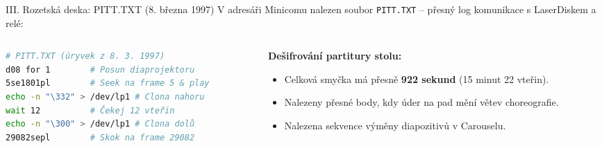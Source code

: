 \documentclass[aspectratio=169,11pt]{beamer}
\begin{document}
\begin{frame}[fragile]{III. Rozetská deska: PITT.TXT (8. března 1997)}
  V adresáři Minicomu nalezen soubor \texttt{PITT.TXT} – přesný log komunikace s LaserDiskem a relé:
  \vspace{0.2cm}
  \begin{columns}
    \begin{column}{0.48\textwidth}
\begin{lstlisting}[language=bash]
# PITT.TXT (úryvek z 8. 3. 1997)
d08 for 1        # Posun diaprojektoru
5se1801pl        # Seek na frame 5 & play
echo -n "\332" > /dev/lp1 # Clona nahoru
wait 12          # Čekej 12 vteřin
echo -n "\300" > /dev/lp1 # Clona dolů
29082sepl        # Skok na frame 29082
\end{lstlisting}
    \end{column}
    \begin{column}{0.48\textwidth}
      \textbf{Dešifrování partitury stolu:}
      \begin{itemize}
        \item Celková smyčka má přesně \textbf{922 sekund} (15 minut 22 vteřin).
        \item Nalezeny přesné body, kdy úder na pad mění větev choreografie.
        \item Nalezena sekvence výměny diapozitivů v Carouselu.
      \end{itemize}
    \end{column}
  \end{columns}
\end{frame}
\end{document}
